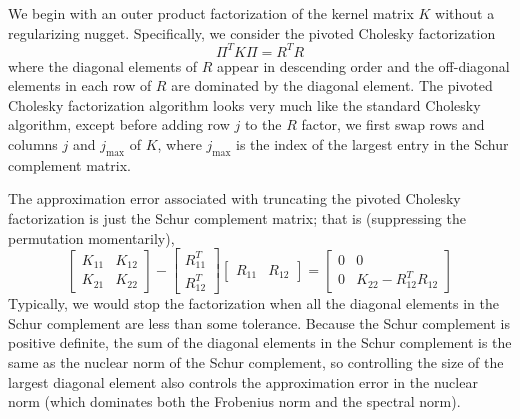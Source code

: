 \documentclass[12pt, leqno]{article} %
\begin{document}
We begin with an outer product factorization of the kernel matrix $K$
without a regularizing nugget.  Specifically, we consider
the pivoted Cholesky factorization
\[
  \Pi^T K \Pi = R^T R
\]
where the diagonal elements of $R$ appear in descending order and
the off-diagonal elements in each row of $R$ are dominated by the
diagonal element.  The pivoted Cholesky factorization algorithm looks
very much like the standard Cholesky algorithm, except before adding
row $j$ to the $R$ factor, we first swap rows and columns $j$ and
$j_{\max}$ of $K$, where $j_{\max}$ is the index of the largest entry
in the Schur complement matrix.

The approximation error associated with truncating the pivoted
Cholesky factorization is just the Schur complement matrix;
that is (suppressing the permutation momentarily),
\[
  \begin{bmatrix} K_{11} & K_{12} \\ K_{21} & K_{22} \end{bmatrix} -
  \begin{bmatrix} R_{11}^T \\ R_{12}^T \end{bmatrix}
  \begin{bmatrix} R_{11} & R_{12} \end{bmatrix} =
  \begin{bmatrix} 0 & 0 \\ 0 & K_{22} - R_{12}^T R_{12} \end{bmatrix}
\]
Typically, we would stop the
factorization when all the diagonal elements in the Schur
complement are less than some tolerance.  Because the Schur complement
is positive definite, the sum of the diagonal elements in the Schur
complement is the same as the nuclear norm of the Schur complement,
so controlling the size of the largest diagonal element also controls
the approximation error in the nuclear norm (which dominates both the
Frobenius norm and the spectral norm).
\end{document}
